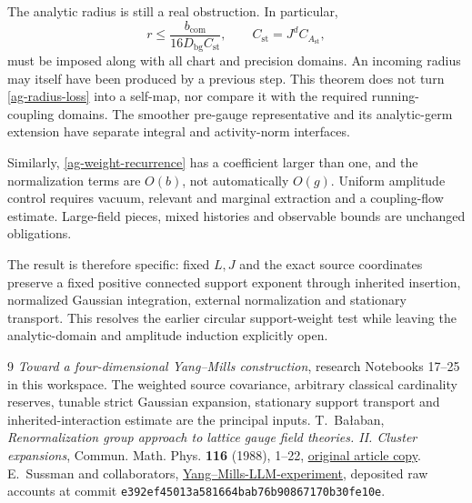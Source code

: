 \documentclass[11pt]{article}
\theoremstyle{remark}
\begin{document}
The analytic radius is still a real obstruction. In particular,
\begin{equation}\label{ag-radius-loss}
 r\le\frac{b_{\mathrm{com}}}{16D_{\mathrm{bg}}C_{\mathrm{st}}},
 \qquad C_{\mathrm{st}}=J^dC_{A_{\mathrm{st}}},
\end{equation}
must be imposed along with all chart and precision domains.
An incoming radius may itself have been produced by a
previous step. This theorem does not turn
\eqref{ag-radius-loss} into a self-map, nor compare it with
the required running-coupling domains. The smoother pre-gauge
representative and its analytic-germ extension have separate
integral and activity-norm interfaces.

Similarly, \eqref{ag-weight-recurrence} has a coefficient
larger than one, and the normalization terms are $O(b)$,
not automatically $O(g)$. Uniform amplitude control requires
vacuum, relevant and marginal extraction and a coupling-flow
estimate. Large-field pieces, mixed histories and observable
bounds are unchanged obligations.

The result is therefore specific: fixed $L,J$ and the exact
source coordinates preserve a fixed positive connected
support exponent through inherited insertion, normalized
Gaussian integration, external normalization and stationary
transport. This resolves the earlier circular support-weight
test while leaving the analytic-domain and amplitude induction
explicitly open.


\begin{thebibliography}{9}
\emph{Toward a four-dimensional Yang--Mills construction},
research Notebooks 17--25 in this workspace.
The weighted source covariance, arbitrary classical cardinality
reserves, tunable strict Gaussian expansion, stationary support
transport and inherited-interaction estimate are the principal
inputs.
T.~Ba\l aban,
\emph{Renormalization group approach to lattice gauge field
theories. II. Cluster expansions},
Commun. Math. Phys. \textbf{116} (1988), 1--22,
\href{https://scispace.com/pdf/renormalization-group-approach-to-lattice-gauge-field-4penm4k7hc.pdf}{original article copy}.
E.~Sussman and collaborators,
\href{https://github.com/ethanwsussman/Yang--Mills-LLM-experiment}{Yang--Mills-LLM-experiment},
deposited raw accounts at commit
\texttt{e392ef45013a581664bab76b90867170b30fe10e}.
\end{thebibliography}
\end{document}
